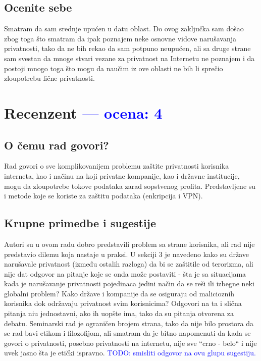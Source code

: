 \documentclass[a4paper]{report}
\newcommand{\odgovor}[1]{\textcolor{blue}{#1}}
\begin{document}
\section{Ocenite sebe}
Smatram da sam srednje upućen u datu oblast. Do ovog zaključka sam došao zbog toga što smatram da ipak poznajem neke osnovne vidove narušavanja privatnosti, tako da ne bih rekao da sam potpuno neupućen, ali sa druge strane sam svestan da mnoge stvari vezane za privatnost na Internetu ne poznajem i da postoji mnogo toga što mogu da naučim iz ove oblasti ne bih li sprečio zloupotrebu lične privatnosti. 

\chapter{Recenzent \odgovor{--- ocena: 4} }


\section{O čemu rad govori?}
Rad govori o sve komplikovanijem problemu zaštite privatnosti korisnika interneta, kao i načinu na koji privatne kompanije, kao i državne institucije, mogu da zloupotrebe tokove podataka zarad sopstvenog profita. Predstavljene su i metode koje se koriste za zaštitu podataka (enkripcija i VPN).


\section{Krupne primedbe i sugestije}
Autori su u ovom radu dobro predstavili problem sa strane korisnika, ali rad nije predstavio dilemu koja nastaje u praksi. U sekciji 3 je navedeno kako su države narušavale privatnost (između ostalih razloga) da bi se zaštitile od terorizma, ali nije dat odgovor na pitanje koje se onda može postaviti - šta je sa situacijama kada je narušavanje privatnosti pojedinaca jedini način da se reši ili izbegne neki globalni problem? Kako države i kompanije da se osiguraju od malicioznih korisnika dok održavaju privatnost svim korisnicima? Odgovori na ta i slična pitanja niu jednostavni, ako ih uopšte ima, tako da su pitanja otvorena za debatu. Seminarski rad je ograničen brojem strana, tako da nije bilo prostora da se rad bavi etikom i filozofijom, ali smatram da je bitno napomenuti da kada se govori o privatnosti, posebno privatnosti na internetu, nije sve ``crno - belo`` i nije uvek jasno šta je etički ispravno.
\odgovor{TODO: smisliti odgovor na ovu glupu sugestiju.}
 
\end{document}
